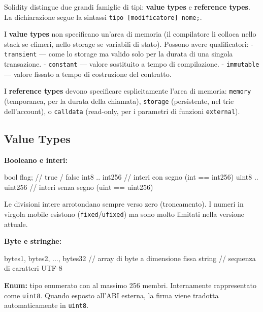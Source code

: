 \documentclass[
  italian,
  openany]{book}
\newenvironment{Shaded}{\begin{snugshade}}{\end{snugshade}}
\newcommand{\NormalTok}[1]{#1}
\begin{document}
Solidity distingue due grandi famiglie di tipi: \textbf{value types} e
\textbf{reference types}. La dichiarazione segue la sintassi
\texttt{tipo\ {[}modificatore{]}\ nome;}.

I \textbf{value types} non specificano un'area di memoria (il
compilatore li colloca nello stack se efimeri, nello storage se
variabili di stato). Possono avere qualificatori: - \texttt{transient}
--- come lo storage ma valido solo per la durata di una singola
transazione. - \texttt{constant} --- valore sostituito a tempo di
compilazione. - \texttt{immutable} --- valore fissato a tempo di
costruzione del contratto.

I \textbf{reference types} devono specificare esplicitamente l'area di
memoria: \texttt{memory} (temporanea, per la durata della chiamata),
\texttt{storage} (persistente, nel trie dell'account), o
\texttt{calldata} (read-only, per i parametri di funzioni
\texttt{external}).

\subsection{Value Types}\label{value-types}

\textbf{Booleano e interi:}

\begin{Shaded}
\begin{Highlighting}[]
\NormalTok{bool flag;                  // true / false}
\NormalTok{int8 .. int256              // interi con segno (int == int256)}
\NormalTok{uint8 .. uint256            // interi senza segno (uint == uint256)}
\end{Highlighting}
\end{Shaded}

Le divisioni intere arrotondano sempre verso zero (troncamento). I
numeri in virgola mobile esistono (\texttt{fixed}/\texttt{ufixed}) ma
sono molto limitati nella versione attuale.

\textbf{Byte e stringhe:}

\begin{Shaded}
\begin{Highlighting}[]
\NormalTok{bytes1, bytes2, ..., bytes32    // array di byte a dimensione fissa}
\NormalTok{string                          // sequenza di caratteri UTF{-}8}
\end{Highlighting}
\end{Shaded}

\textbf{Enum:} tipo enumerato con al massimo 256 membri. Internamente
rappresentato come \texttt{uint8}. Quando esposto all'ABI esterna, la
firma viene tradotta automaticamente in \texttt{uint8}.
\end{document}
